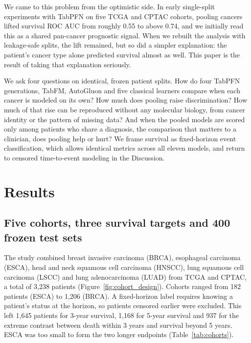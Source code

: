 \documentclass[11pt, a4paper, onecolumn, confidential, copyright]{hawkfranklin}
\begin{document}
We came to this problem from the optimistic side. In early single-split experiments with TabPFN on five TCGA and CPTAC cohorts, pooling cancers lifted survival ROC AUC from roughly 0.55 to above 0.74, and we initially read this as a shared pan-cancer prognostic signal. When we rebuilt the analysis with leakage-safe splits, the lift remained, but so did a simpler explanation: the patient's cancer type alone predicted survival almost as well. This paper is the result of taking that explanation seriously.

We ask four questions on identical, frozen patient splits. How do four TabPFN generations, TabFM, AutoGluon and five classical learners compare when each cancer is modeled on its own? How much does pooling raise discrimination? How much of that rise can be reproduced without any molecular biology, from cancer identity or the pattern of missing data? And when the pooled models are scored only among patients who share a diagnosis, the comparison that matters to a clinician, does pooling help or hurt? We frame survival as fixed-horizon event classification, which allows identical metrics across all eleven models, and return to censored time-to-event modeling in the Discussion.

\section{Results}
\label{sec:results}

\subsection{Five cohorts, three survival targets and 400 frozen test sets}

The study combined breast invasive carcinoma (BRCA), esophageal carcinoma (ESCA), head and neck squamous cell carcinoma (HNSCC), lung squamous cell carcinoma (LSCC) and lung adenocarcinoma (LUAD) from TCGA and CPTAC, a total of 3,238 patients (Figure~\ref{fig:cohort_design}).\citep{tcga2012brca,tcga2017esca,tcga2015hnsc,tcga2012lusc,tcga2014luad,liu2018clinical,li2023pancancer} Cohorts ranged from 182 patients (ESCA) to 1,206 (BRCA). A fixed-horizon label requires knowing a patient's status at the horizon, so patients censored earlier were excluded. This left 1,645 patients for 3-year survival, 1,168 for 5-year survival and 937 for the extreme contrast between death within 3 years and survival beyond 5 years. ESCA was too small to form the two longer endpoints (Table~\ref{tab:cohorts}).
\end{document}
